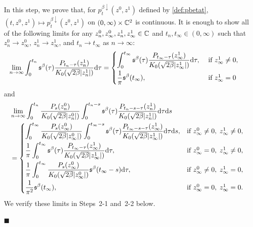 \documentclass[12pt, twoside]{article}
\numberwithin{figure}{section}
\newcommand{\1}{\mathds 1}
\newcommand{\da}{{\downarrow}}
\renewcommand{\d}{{\mathrm d}}
\newcommand{\2}{{\mathbf 1}}
\newcommand{\s}{{\mathfrak s}}
\renewenvironment{proof}[1][\proofname]{\noindent {\bfseries #1.}\;}{\hfill\ensuremath{\blacksquare}\\}
\begin{document}
\begin{proof}[Proof of Theorem~\ref{thm:formulas}]
 In this step, we prove that, for $p^{\beta\da}_t(z^0,z^1)$ defined by \eqref{def:pbetat}, $(t,z^0,z^1)\mapsto p_t^{\beta\da}(z^0,z^1)$ on $(0,\infty)\times \Bbb C^2$ is continuous. It is enough to show all of the following limits for any $z^0_n,z^0_\infty,z^1_n,z^1_\infty\in \Bbb C$ and $t_n,t_\infty\in (0,\infty)$ such that $z^0_n\to z^0_\infty$, $z^1_n\to z^1_\infty$, and $t_n\to t_\infty$ as $n\to\infty$: 
\begin{align}
&\lim_{n\to\infty}\int_0^{t_n}\s^\beta(\tau)\frac{P_{t_n-\tau}(z^1_n)}{K_0(\sqrt{2\beta}|z^1_n|)}\d \tau=
\begin{cases}
\displaystyle \int_0^{t_\infty}\s^\beta(\tau)\frac{P_{t_\infty-\tau}(z_\infty^1)}{K_0(\sqrt{2\beta}|z^1_\infty|)}\d \tau,&\mbox{ if } z^1_\infty\neq 0,\\
\vspace{-.4cm}\\
\displaystyle \frac{1}{\pi}\s^\beta(t_\infty),& \mbox{ if }z^1_\infty=0
\end{cases}\label{DYlim:11}
\end{align}
and
\begin{align}
&\lim_{n\to\infty} \int_0^{t_n} \frac{P_{s}( z_n^0)}{K_0(\sqrt{2\beta}|z_n^0|)}\int_0^{t_n-s}\s^\beta(\tau)  \frac{P_{t_n-s-\tau}(z_n^1)}{K_0(\sqrt{2\beta }|z_n^1|)}
\d \tau\d s\notag\\
&=\begin{cases}
\displaystyle \int_0^{t_\infty} \frac{P_{s}( z_\infty^0)}{K_0(\sqrt{2\beta}|z_\infty^0|)}\int_0^{t_\infty-s}\s^\beta(\tau)  \frac{P_{t_\infty-s-\tau}(z_\infty^1)}{K_0(\sqrt{2\beta }|z_\infty^1|)}
\d \tau\d s,&\mbox{if }z^0_\infty\neq 0,\;z^1_\infty\neq 0,\\
\vspace{-.4cm}\\
\displaystyle\frac{1}{\pi} \int_0^{t_\infty}\s^\beta(\tau)  \frac{P_{t_\infty-\tau}(z_\infty^1)}{K_0(\sqrt{2\beta }|z_\infty^1|)}
\d \tau,&\mbox{if }z^0_\infty= 0,\;z^1_\infty\neq 0,\\
\vspace{-.4cm}\\
\displaystyle\frac{1}{\pi} \int_0^{t_\infty} \frac{P_{s}( z_\infty^0)}{K_0(\sqrt{2\beta}|z_\infty^0|)}\s^\beta(t_\infty-s)\d \tau,&\mbox{if }z^0_\infty\neq 0,\;z^1_\infty= 0,\\
\vspace{-.4cm}\\
\displaystyle \frac{1}{\pi^2}\s^\beta(t_\infty),&\mbox{if }z^0_\infty=0,\;z^1_\infty=0.
\end{cases}\label{DYlim:12}
\end{align}
We verify these limits in Steps~2-1 and~2-2 below.\smallskip 


\end{proof}
\end{document}
